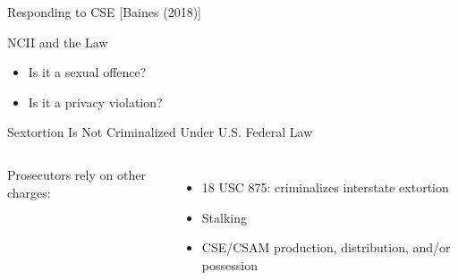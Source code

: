 \documentclass[nobackground,dvipsnames,table,aspectratio=169]{beamer}
\begin{document}
\begin{frame}{Responding to CSE}
    \centering
    [Baines (2018)]
\end{frame}

\begin{frame}{NCII and the Law}
    \large
    \begin{itemize}
        \item Is it a sexual offence?
        \item Is it a privacy violation?
    \end{itemize}
\end{frame}

\begin{frame}{Sextortion Is Not Criminalized Under U.S. Federal Law}
    \begin{columns}
            Prosecutors rely on other charges:
            \begin{itemize}
                \item 18 USC 875: criminalizes interstate extortion
                \item Stalking
                \item CSE/CSAM production, distribution, and/or possession
            \end{itemize}
    \end{columns}
\end{frame}
\end{document}
